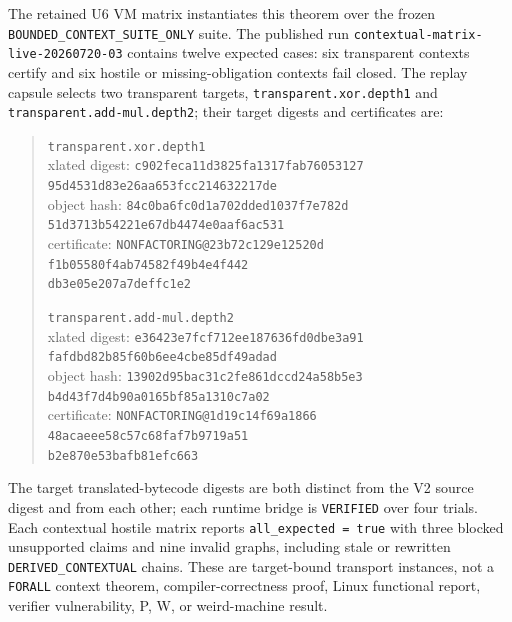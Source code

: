 \documentclass[conference]{IEEEtran}
\begin{document}
The retained U6 VM matrix instantiates this theorem over the frozen \texttt{BOUNDED\_CONTEXT\_SUITE\_ONLY} suite. The published run \texttt{contextual-matrix-live-20260720-03} contains twelve expected cases: six transparent contexts certify and six hostile or missing-obligation contexts fail closed. The replay capsule selects two transparent targets, \texttt{transparent.xor.depth1} and \texttt{transparent.add-mul.depth2}; their target digests and certificates are:

\begin{quote}
\footnotesize
\texttt{transparent.xor.depth1}\\
\quad xlated digest: \texttt{c902feca11d3825fa1317fab76053127}\\
\quad\texttt{95d4531d83e26aa653fcc214632217de}\\
\quad object hash: \texttt{84c0ba6fc0d1a702dded1037f7e782d}\\
\quad\texttt{51d3713b54221e67db4474e0aaf6ac531}\\
\quad certificate: \texttt{NONFACTORING@23b72c129e12520d}\\
\quad\texttt{f1b05580f4ab74582f49b4e4f442}\\
\quad\texttt{db3e05e207a7deffc1e2}

\texttt{transparent.add-mul.depth2}\\
\quad xlated digest: \texttt{e36423e7fcf712ee187636fd0dbe3a91}\\
\quad\texttt{fafdbd82b85f60b6ee4cbe85df49adad}\\
\quad object hash: \texttt{13902d95bac31c2fe861dccd24a58b5e3}\\
\quad\texttt{b4d43f7d4b90a0165bf85a1310c7a02}\\
\quad certificate: \texttt{NONFACTORING@1d19c14f69a1866}\\
\quad\texttt{48acaeee58c57c68faf7b9719a51}\\
\quad\texttt{b2e870e53bafb81efc663}
\end{quote}

The target translated-bytecode digests are both distinct from the V2 source digest and from each other; each runtime bridge is \texttt{VERIFIED} over four trials. Each contextual hostile matrix reports \texttt{all\_expected = true} with three blocked unsupported claims and nine invalid graphs, including stale or rewritten \texttt{DERIVED\_CONTEXTUAL} chains. These are target-bound transport instances, not a \texttt{FORALL} context theorem, compiler-correctness proof, Linux functional report, verifier vulnerability, P, W, or weird-machine result.
\end{document}

